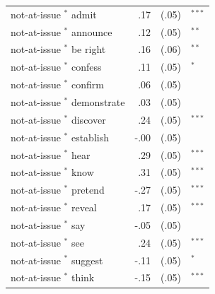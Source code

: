 \documentclass[11pt,fleqn]{article}
\newcommand{\6}{\mbox{$[\hspace*{-.6mm}[$}}
\newcommand{\9}{\mbox{$]\hspace*{-.6mm}]$}}
\begin{document}
\begin{table}
\begin{center}
\begin{tabular}{l r r l}
not-at-issue $^*$  admit       & .17    & (.05) & $^{***}$  \\
not-at-issue $^*$  announce    & .12    & (.05) & $^{**}$   \\
not-at-issue $^*$  be right    & .16    & (.06) & $^{**}$   \\
not-at-issue $^*$  confess     & .11   & (.05) & $^{*}$    \\
not-at-issue $^*$  confirm     & .06    & (.05) &        \\
not-at-issue $^*$  demonstrate & .03    & (.05) &        \\
not-at-issue $^*$  discover    & .24    & (.05) & $^{***}$  \\
not-at-issue $^*$  establish   & -.00    & (.05) &       \\
not-at-issue $^*$  hear        & .29    & (.05) & $^{***}$  \\
not-at-issue $^*$  know        & .31    & (.05) & $^{***}$  \\
not-at-issue $^*$  pretend     & -.27    & (.05) & $^{***}$ \\
not-at-issue $^*$  reveal      & .17   & (.05) & $^{***}$  \\
not-at-issue $^*$  say         & -.05    & (.05) &       \\
not-at-issue $^*$  see         & .24    & (.05) & $^{***}$  \\
not-at-issue $^*$  suggest     & -.11    & (.05) & $^{*}$   \\
not-at-issue $^*$  think       & -.15    & (.05) & $^{***}$ \\


\end{tabular}
\end{center}
\end{table}
\end{document}
